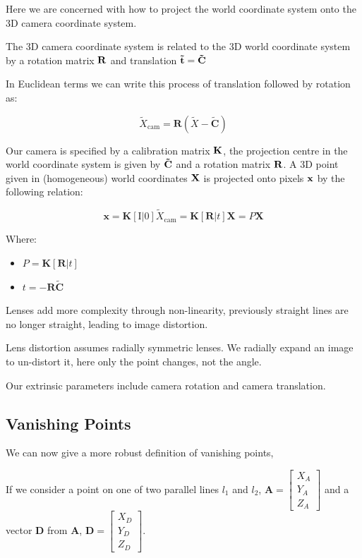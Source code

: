 \documentclass{article}
\begin{document}
Here we are concerned with how to project the world coordinate system onto the 3D camera coordinate system.

The 3D camera coordinate system is related to the 3D world coordinate system by a rotation matrix $\bf R$ and translation $\bf \tilde{t} = \tilde{C}$

In Euclidean terms we can write this process of translation followed by rotation as:

\[
  \tilde{X}_{\text{cam}}= \mathbf{R}(\tilde{X}-\mathbf{\tilde{C}} )
\]

Our camera is specified by a calibration matrix $\bf K$, the projection centre in the world coordinate system is given by $\bf \tilde{C}$ and a rotation matrix $\bf R$. A 3D point given in (homogeneous) world coordinates $\bf X$ is projected onto pixels $\bf x$ by the following relation:

\[
  \mathbf{x} = \mathbf{K}[\text{I}|0]\tilde{X}_{\text{cam}} = \mathbf{K} [\mathbf{R} | t]\mathbf{X} = P \mathbf{X}
\]

Where:

\begin{itemize}
  \item $P = \mathbf{K}[\mathbf{R}|t ]$
  \item $t = -\mathbf{R \tilde{C}}$
\end{itemize}

Lenses add more complexity through non-linearity, previously straight lines are no longer straight, leading to image distortion.

Lens distortion assumes radially symmetric lenses. We radially expand an image to un-distort it, here only the point changes, not the angle.

Our extrinsic parameters include camera rotation and camera translation.

\subsection{Vanishing Points}

We can now give a more robust definition of vanishing points,

If we consider a point on one of two parallel lines $l_{1}$ and $l_{2}$, $\mathbf{A} = \begin{bmatrix}
X_{A}\\Y_{A}\\Z_{A}
\end{bmatrix} $ and a vector $\mathbf{D} $ from $\mathbf{A}$, $\mathbf{D}  = \begin{bmatrix}
X_{D}\\ Y_{D}\\Z_{D}
\end{bmatrix}$.
\end{document}
